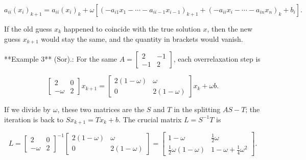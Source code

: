 \[a_{ii}(x_{i})_{k+1}=a_{ii}(x_{i})_{k}+\omega[(-a_{i1}x_{1}-\cdots-a_{ii-1}x_{i -1})_{k+1}+(-a_{ii}x_{i}-\cdots-a_{in}x_{n})_{k}+b_{i}].\]

If the old guess \(x_{k}\) happened to coincide with the true solution \(x\), then the new guess \(x_{k+1}\) would stay the same, and the quantity in brackets would vanish.

**Example 3** (Sor).: For the same \(A=\left[\begin{smallmatrix}2&-1\\ -1&2\end{smallmatrix}\right]\), each overrelaxation step is

\[\begin{bmatrix}2&0\\ -\omega&2\end{bmatrix}x_{k+1}=\begin{bmatrix}2(1-\omega)&\omega\\ 0&2(1-\omega)\end{bmatrix}x_{k}+\omega b.\]

If we divide by \(\omega\), these two matrices are the \(S\) and \(T\) in the splitting \(AS-T\); the iteration is back to \(Sx_{k+1}=Tx_{k}+b\). The crucial matrix \(L=S^{-1}T\) is

\[L=\begin{bmatrix}2&0\\ -\omega&2\end{bmatrix}^{-1}\begin{bmatrix}2(1-\omega)&\omega\\ 0&2(1-\omega)\end{bmatrix}=\begin{bmatrix}1-\omega&\frac{1}{2}\omega\\ \frac{1}{2}\omega(1-\omega)&1-\omega+\frac{1}{4}\omega^{2}\end{bmatrix}.\] 